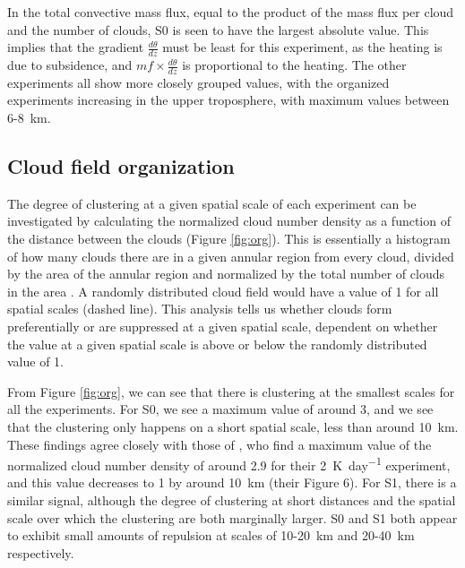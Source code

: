 \documentclass[11pt,a4paper]{article}
\newcommand\todo[1]{\textbf{TODO: #1}}
\begin{document}
In the total convective mass flux, equal to the product of the mass flux per cloud and the number of clouds, S0 is seen to have the largest absolute value. This implies that the gradient $\frac{d \theta}{dz}$ must be least for this experiment, as the heating is due to subsidence, and $mf \times \frac{d \theta}{dz}$ is proportional to the heating. The other experiments all show more closely grouped values, with the organized experiments increasing in the upper troposphere, with maximum values between \SI{6}{}-\SI{8}{km}. 

\subsection{Cloud field organization}

The degree of clustering at a given spatial scale of each experiment can be investigated by calculating the normalized cloud number density as a function of the distance between the clouds (Figure \ref{fig:org}). This is essentially a histogram of how many clouds there are in a given annular region from every cloud, divided by the area of the annular region and normalized by the total number of clouds in the area \parencite{CC2006II}. A randomly distributed cloud field would have a value of 1 for all spatial scales (dashed line). This analysis tells us whether clouds form preferentially or are suppressed at a given spatial scale, dependent on whether the value at a given spatial scale is above or below the randomly distributed value of 1.

From Figure \ref{fig:org}, we can see that there is clustering at the smallest scales for all the experiments. For S0, we see a maximum value of around 3, and we see that the clustering only happens on a short spatial scale, less than around \SI{10}{km}. These findings agree closely with those of \cite{CC2006II}, who find a maximum value of the normalized cloud number density of around 2.9 for their \SI{2}{K.day^{-1}} experiment, and this value decreases to 1 by around \SI{10}{km} (their Figure 6). For S1, there is a similar signal, although the degree of clustering at short distances and the spatial scale over which the clustering are both marginally larger. S0 and S1 both appear to exhibit small amounts of repulsion at scales of \SI{10}{}-\SI{20}{km} and \SI{20}{}-\SI{40}{km} respectively.
\end{document}
